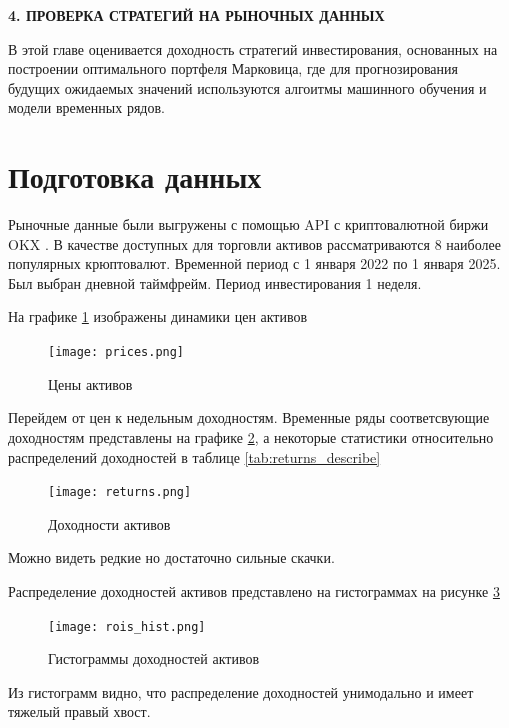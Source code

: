 \newpage
\begin{center}
	\textbf{\large 4. ПРОВЕРКА СТРАТЕГИЙ НА РЫНОЧНЫХ ДАННЫХ}
\end{center}

В этой главе оценивается доходность стратегий инвестирования, основанных на построении оптимального портфеля Марковица,
где для прогнозирования будущих ожидаемых значений используются алгоитмы машинного обучения и модели временных рядов.
\section{Подготовка данных}

Рыночные данные были выгружены с помощью API с криптовалютной биржи OKX \cite{okx}.
В качестве доступных для торговли активов рассматриваются 8 наиболее популярных крюптовалют.
Временной период с 1 января 2022 по  1 января 2025.
Был выбран дневной таймфрейм.
Период инвестирования 1 неделя.

На графике \ref{fig:prices} изображены динамики цен активов 

\begin{figure}[H]
	\centering
	\texttt{[image: prices.png]}
	\caption{Цены активов}
	\label{fig:prices}
\end{figure}

Перейдем от цен к недельным доходностям. Временные ряды соответсвующие доходностям 
представлены на графике \ref{fig:returns}, а некоторые статистики относительно распределений
доходностей в таблице \ref{tab:returns_describe}



\begin{figure}[H]
	\centering
	\texttt{[image: returns.png]}
	\caption{Доходности активов}
	\label{fig:returns}
\end{figure}
Можно видеть редкие но достаточно сильные скачки.

Распределение доходностей активов представлено на гистограммах на рисунке \ref{fig:rois_hist}

\begin{figure}[H]
	\centering
	\texttt{[image: rois\_hist.png]}
	\caption{Гистограммы доходностей активов}
	\label{fig:rois_hist}
\end{figure}

Из гистограмм видно, что распределение доходностей унимодально и имеет тяжелый правый хвост.


